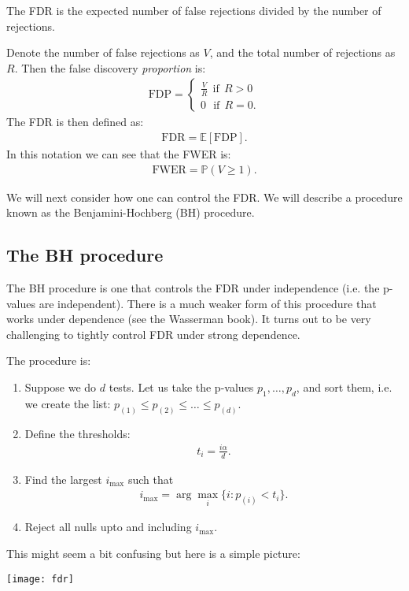 \documentclass[twoside,12pt]{article}
\begin{document}
The FDR is the expected number
of false rejections divided by the number of rejections. 

Denote the number of false rejections as $V$, and the total number of rejections as $R$.
Then the false discovery \emph{proportion} is:
\begin{align*}
\text{FDP} = \begin{cases}
\frac{V}{R} ~~\text{if}~~R > 0 \\
0~~~\text{if}~~R = 0.
\end{cases}
\end{align*}
The FDR is then defined as:
\begin{align*}
\text{FDR} = \mathbb{E}[\text{FDP}].
\end{align*}
In this notation we can see that the FWER is:
\begin{align*}
\text{FWER} = \mathbb{P}(V \geq 1).
\end{align*}

We will next consider how one can control the FDR. We will describe a procedure known as the
Benjamini-Hochberg (BH) procedure.

\subsection{The BH procedure}
The BH procedure is one that controls the FDR under independence (i.e. the p-values are independent). There is a much weaker form of this procedure that works under dependence (see the Wasserman book).
It turns out to be very challenging to tightly control FDR under strong dependence. 

The procedure is:
\begin{enumerate}
\item Suppose we do $d$ tests. 
Let us take the p-values $p_1,\ldots,p_d$, and sort them, i.e. we create the list:
$p_{(1)} \leq p_{(2)} \leq \ldots \leq p_{(d)}$.
\item Define the thresholds: 
\begin{align*}
t_i = \frac{i \alpha}{d}.
\end{align*}
\item Find the largest $i_{\max}$ such that
\begin{align*}
i_{\max} = \arg \max_i \{i: p_{(i)} < t_i \}.
\end{align*}
\item Reject all nulls upto and including $i_{\max}$.
\end{enumerate}
This might seem a bit confusing but here is a simple picture:
\begin{center}
\texttt{[image: fdr]}
\end{center}
\end{document}
